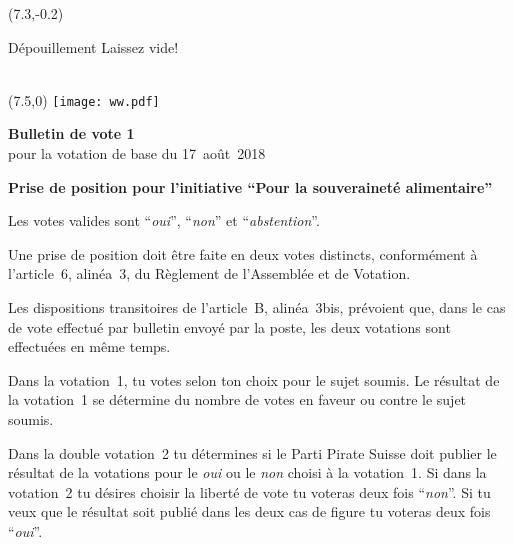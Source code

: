 \documentclass[11pt, a4paper]{scrartcl}
\newcommand{\votingdate}{17~août~2018}
\newcommand{\oui}{\enquote{\textit{oui}}}
\newcommand{\non}{\enquote{\textit{non}}}
\newcommand{\abstention}{\enquote{\textit{abstention}}}
\begin{document}
{\begin{minipage}[t][12.5cm][t]{\textwidth}
\begin{textblock}{6}(7.3,-0.2)
\begin{framed}
Dépouillement \hfill Laissez vide! \\
\vspace{1.5cm} ~ \\
\end{framed}
\end{textblock}


\end{minipage}

\newpage

\begin{minipage}[t][12.5cm][t]{17.7cm}

\begin{textblock}{6}(7.5,0)
\texttt{[image: ww.pdf]}
\end{textblock}

{\LARGE\textbf{Bulletin de vote 1}} \\
pour la votation de base du \votingdate{} \\

\vspace{2cm}

\textbf{Prise de position pour l'initiative \enquote{Pour la souveraineté alimentaire}}

\vspace{0.2cm}
Les votes valides sont \oui{}, \non{} et \abstention{}.

\vspace{0.2cm}
Une prise de position doit être faite en deux votes distincts, conformément à l'article~6, alinéa~3, du Règlement de l'Assemblée et de Votation.

\vspace{0.2cm}
Les dispositions transitoires de l'article~B, alinéa~3bis, prévoient que, dans le cas de vote effectué par bulletin envoyé par la poste, les deux votations sont effectuées en même temps.

\vspace{0.2cm}
Dans la votation~1, tu votes selon ton choix pour le sujet soumis. Le résultat de la votation~1 se détermine du nombre de votes en faveur ou contre le sujet soumis.

\vspace{0.2cm}
Dans la double votation~2 tu détermines si le Parti Pirate Suisse doit publier le résultat de la votations pour le \textit{oui} ou le \textit{non} choisi à la votation~1. Si dans la votation~2 tu désires choisir la liberté de vote tu voteras deux fois \non{}. Si tu veux que le résultat soit publié dans les deux cas de figure tu voteras deux fois \oui{}.


\end{minipage}}
\end{document}
